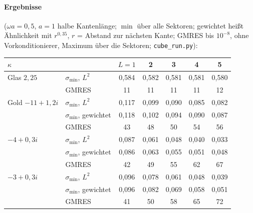 \documentclass[11pt, a4paper]{article}
\begin{document}
\paragraph{Ergebnisse} ($\omega a=0{,}5$, $a=1$ halbe Kantenlänge; $\min$ über alle
Sektoren; gewichtet heißt Ähnlichkeit mit $r^{0{,}35}$, $r$ = Abstand zur nächsten
Kante; GMRES bis $10^{-8}$, ohne Vorkonditionierer, Maximum über die Sektoren;
\texttt{cube\_run.py}):
\begin{center}\small
\begin{tabular}{llccccc}
\toprule
$\kappa$ & & $L=1$ & 2 & 3 & 4 & 5\\
\midrule
Glas $2{,}25$ & $\sigma_{\min}$, $L^2$ & 0,584 & 0,582 & 0,581 & 0,581 & 0,580\\
 & GMRES & 11 & 11 & 11 & 11 & 12\\
\midrule
Gold $-11+1{,}2i$ & $\sigma_{\min}$, $L^2$ & 0,117 & 0,099 & 0,090 & 0,085 & 0,082\\
 & $\sigma_{\min}$, gewichtet & 0,118 & 0,102 & 0,094 & 0,090 & 0,087\\
 & GMRES & 43 & 48 & 50 & 54 & 56\\
\midrule
$-4+0{,}3i$ & $\sigma_{\min}$, $L^2$ & 0,087 & 0,061 & 0,048 & 0,040 & 0,033\\
 & $\sigma_{\min}$, gewichtet & 0,086 & 0,063 & 0,055 & 0,051 & 0,048\\
 & GMRES & 42 & 49 & 55 & 62 & 67\\
\midrule
$-3+0{,}3i$ & $\sigma_{\min}$, $L^2$ & 0,096 & 0,078 & 0,061 & 0,048 & 0,039\\
 & $\sigma_{\min}$, gewichtet & 0,096 & 0,082 & 0,069 & 0,058 & 0,051\\
 & GMRES & 41 & 50 & 58 & 65 & 72\\
\bottomrule
\end{tabular}
\end{center}
\end{document}
